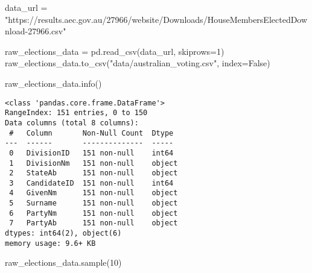 \documentclass[
  letterpaper,
  DIV=11,
  numbers=noendperiod]{scrreprt}
\newenvironment{Shaded}{\begin{snugshade}}{\end{snugshade}}
\newcommand{\DecValTok}[1]{\textcolor[rgb]{0.68,0.00,0.00}{#1}}
\newcommand{\NormalTok}[1]{\textcolor[rgb]{0.00,0.23,0.31}{#1}}
\newcommand{\OperatorTok}[1]{\textcolor[rgb]{0.37,0.37,0.37}{#1}}
\newcommand{\StringTok}[1]{\textcolor[rgb]{0.13,0.47,0.30}{#1}}
\newcommand{\VariableTok}[1]{\textcolor[rgb]{0.07,0.07,0.07}{#1}}
\begin{document}
\begin{Shaded}
\begin{Highlighting}[]
\NormalTok{data\_url }\OperatorTok{=} \StringTok{"https://results.aec.gov.au/27966/website/Downloads/HouseMembersElectedDownload{-}27966.csv"}

\NormalTok{raw\_elections\_data }\OperatorTok{=}\NormalTok{ pd.read\_csv(data\_url, skiprows}\OperatorTok{=}\DecValTok{1}\NormalTok{)}
\NormalTok{raw\_elections\_data.to\_csv(}\StringTok{"data/australian\_voting.csv"}\NormalTok{, index}\OperatorTok{=}\VariableTok{False}\NormalTok{)}

\NormalTok{raw\_elections\_data.info()}
\end{Highlighting}
\end{Shaded}

\begin{verbatim}
<class 'pandas.core.frame.DataFrame'>
RangeIndex: 151 entries, 0 to 150
Data columns (total 8 columns):
 #   Column       Non-Null Count  Dtype 
---  ------       --------------  ----- 
 0   DivisionID   151 non-null    int64 
 1   DivisionNm   151 non-null    object
 2   StateAb      151 non-null    object
 3   CandidateID  151 non-null    int64 
 4   GivenNm      151 non-null    object
 5   Surname      151 non-null    object
 6   PartyNm      151 non-null    object
 7   PartyAb      151 non-null    object
dtypes: int64(2), object(6)
memory usage: 9.6+ KB
\end{verbatim}

\begin{Shaded}
\begin{Highlighting}[]
\NormalTok{raw\_elections\_data.sample(}\DecValTok{10}\NormalTok{)}
\end{Highlighting}
\end{Shaded}
\end{document}
